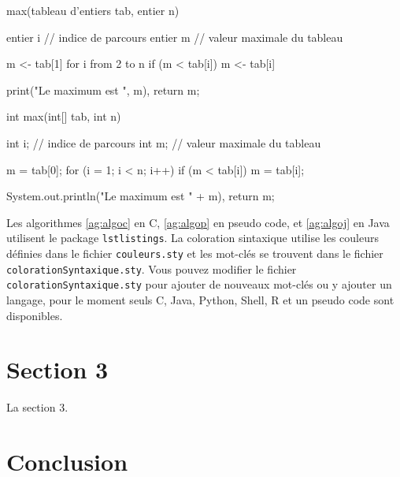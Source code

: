 \begin{algorithm}
  \begin{PseudoCode}
max(tableau d'entiers tab, entier n) {
  entier i // indice de parcours
  entier m // valeur maximale du tableau
  
  m <- tab[1]
  for i from 2 to n {
    if (m < tab[i]) {
      m <- tab[i]
    }
  }
  
  print("Le maximum est ", m),
  return m;
}
  \end{PseudoCode}
  \caption[Algo en PseudoCode]{Retourne la valeur maximale du tableau tab.\label{ag:algop}}
\end{algorithm}

\begin{algorithm}
  \begin{Java}
int max(int[] tab, int n) {
  int i; // indice de parcours
  int m; // valeur maximale du tableau
  
  m = tab[0];
  for (i = 1; i < n; i++) {
    if (m < tab[i]) {
      m = tab[i];
    }
  }
  
  System.out.println("Le maximum est " + m),
  return m;
}
  \end{Java}
  \caption[Algo en Java]{Retourne la valeur maximale du tableau tab.\label{ag:algoj}}
\end{algorithm}

Les algorithmes \ref{ag:algoc} en C, \ref{ag:algop} en pseudo code, et \ref{ag:algoj} en Java utilisent le package \texttt{lstlistings}. La coloration sintaxique utilise les couleurs définies dans le fichier \texttt{couleurs.sty} et les mot-clés se trouvent dans le fichier \texttt{colorationSyntaxique.sty}. Vous pouvez modifier le fichier \texttt{colorationSyntaxique.sty} pour ajouter de nouveaux mot-clés ou y ajouter un langage, pour le moment seuls C, Java, Python, Shell, R et un pseudo code sont disponibles.

\section{Section 3}

La section 3.

\section{Conclusion}
